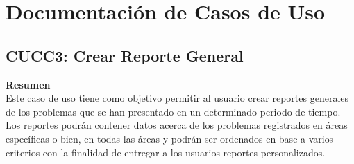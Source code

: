 \documentclass[10pt,spanish]{article}
\begin{document}
	\section{Documentación de Casos de Uso}

		\subsection{CUCC3: Crear Reporte General}

		\textbf{\large Resumen}{\large }\\
		{Este caso de uso tiene como objetivo permitir al usuario crear reportes generales de los problemas que se han presentado en un determinado periodo de tiempo. Los reportes podrán contener
		datos acerca de los problemas registrados en áreas específicas o bien, en todas las áreas  
		y podrán ser ordenados en base a varios criterios con la finalidad de entregar a los
		usuarios reportes personalizados.}\\
		{\large \par}
\end{document}
